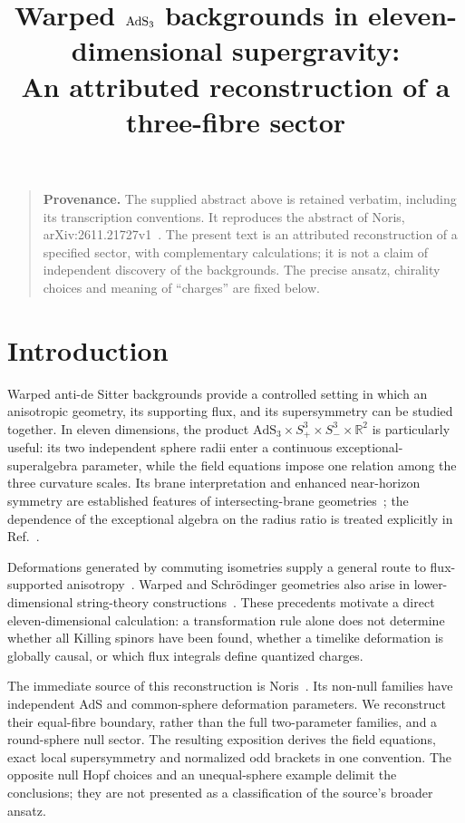 \documentclass[11pt,a4paper]{article}
\title{Warped $\AdS_3$ backgrounds in eleven-dimensional supergravity:\\[3pt]
\large An attributed reconstruction of a three-fibre sector}
\author{}
\date{}
\newcommand{\AdS}{\mathrm{AdS}}
\numberwithin{equation}{section}
\begin{document}
\maketitle
\vspace{-2em}
\renewcommand{\abstractname}{Reproduced source abstract}
\begin{abstract}

\end{abstract}
\begin{quote}\small
\textbf{Provenance.} The supplied abstract above is retained verbatim, including its transcription conventions. It reproduces the abstract of Noris, arXiv:2611.21727v1~\cite{Noris2026}. The present text is an attributed reconstruction of a specified sector, with complementary calculations; it is not a claim of independent discovery of the backgrounds. The precise ansatz, chirality choices and meaning of ``charges'' are fixed below.
\end{quote}

\section{Introduction}
Warped anti-de Sitter backgrounds provide a controlled setting in which an anisotropic geometry, its supporting flux, and its supersymmetry can be studied together. In eleven dimensions, the product $\AdS_3\times S^3_+\times S^3_-\times\mathbb R^2$ is particularly useful: its two independent sphere radii enter a continuous exceptional-superalgebra parameter, while the field equations impose one relation among the three curvature scales. Its brane interpretation and enhanced near-horizon symmetry are established features of intersecting-brane geometries~\cite{BoonstraPeetersSkenderis1998,GauntlettMyersTownsend1999}; the dependence of the exceptional algebra on the radius ratio is treated explicitly in Ref.~\cite{BachasEtAl2014}.

Deformations generated by commuting isometries supply a general route to flux-supported anisotropy~\cite{LM2005,GauntlettLeeMateosWaldram2005,CatalOzerDeger2009}. Warped and Schr\"odinger geometries also arise in lower-dimensional string-theory constructions~\cite{OrlandoUruchurtu2010,BobevVanRees2011}. These precedents motivate a direct eleven-dimensional calculation: a transformation rule alone does not determine whether all Killing spinors have been found, whether a timelike deformation is globally causal, or which flux integrals define quantized charges.

The immediate source of this reconstruction is Noris~\cite{Noris2026}. Its non-null families have independent AdS and common-sphere deformation parameters. We reconstruct their equal-fibre boundary, rather than the full two-parameter families, and a round-sphere null sector. The resulting exposition derives the field equations, exact local supersymmetry and normalized odd brackets in one convention. The opposite null Hopf choices and an unequal-sphere example delimit the conclusions; they are not presented as a classification of the source's broader ansatz.
\end{document}
